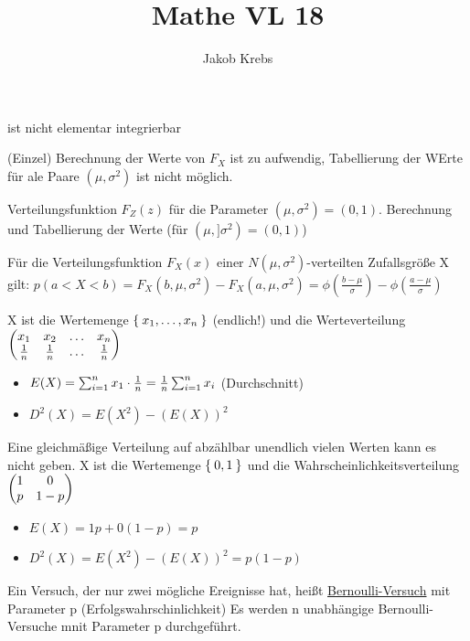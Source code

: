 \documentclass{../tudscript}
\author{Jakob Krebs}
\title{Mathe VL 18}
\begin{document}

ist nicht elementar integrierbar


(Einzel) Berechnung der Werte von $F_X$ ist zu aufwendig, Tabellierung der WErte für ale Paare $(\mu, \sigma^2)$ ist nicht möglich.


Verteilungsfunktion $F_Z (z)$ für die Parameter $(\mu, \sigma^2) = (0,1)$. Berechnung und Tabellierung der Werte (für $(\mu, ]\sigma^2) = (0,1)$)

Für die Verteilungsfunktion $F_X (x)$ einer $N(\mu, \sigma^2)$-verteilten Zufallsgröße X gilt:
$p(a < X < b) = F_X (b, \mu, \sigma^2) - F_X (a, \mu, \sigma^2) = \phi (\frac{b-\mu}{\sigma}) - \phi (\frac{a-\mu}{\sigma})$

X ist die Wertemenge $\Set{x_1, \ldots, x_n}$ (endlich!) und die Werteverteilung $\begin{pmatrix} x_1 & x_2 & \ldots & x_n \\ \frac{1}{n} & \frac{1}{n} & \ldots & \frac{1}{n} \end{pmatrix}$

\begin{itemize}
\item $E(X) = \sum_{i = 1}^n x_1 \cdot \frac{1}{n} = \frac{1}{n} \sum_{i =1}^n x_i$ (Durchschnitt)
\item $D^2(X) = E(X^2) - (E(X))^2$ 
\end{itemize}
Eine gleichmäßige Verteilung auf abzählbar unendlich vielen Werten kann es nicht geben.
X ist die Wertemenge $\Set{0,1}$ und die Wahrscheinlichkeitsverteilung $\begin{pmatrix} 1 & 0 \\ p & 1-p \end{pmatrix}$
\begin{itemize}
\item $E(X) = 1p + 0 (1-p) = p$
\item $D^2(X) = E(X^2) - (E(X))^2 = p(1-p)$
\end{itemize}
Ein Versuch, der nur zwei mögliche Ereignisse hat, heißt \underline{Bernoulli-Versuch} mit Parameter p (Erfolgswahrschinlichkeit)
Es werden n unabhängige Bernoulli-Versuche mnit Parameter p durchgeführt.
\end{document}
